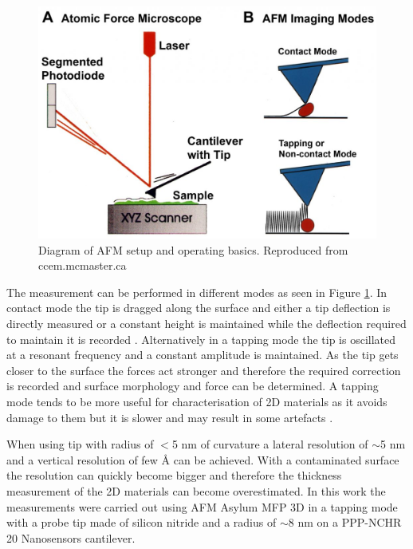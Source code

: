 \begin{figure}[!h]
	\begin{center}
		\includegraphics[scale=0.3]{Methodology/AFMSetup.png}
		\caption{Diagram of AFM setup and operating basics. Reproduced from ccem.mcmaster.ca}
		\label{fig:MethodologyAFMSetup}
	\end{center}
\end{figure}

The measurement can be performed in different modes as seen in Figure \ref{fig:MethodologyAFMSetup}. In contact mode the tip is dragged along the surface and either a tip deflection is directly measured or a constant height is maintained while the deflection required to maintain it is recorded \cite{Binnig1993}. Alternatively in a tapping mode the tip is oscillated at a resonant frequency and a constant amplitude is maintained. As the tip gets closer to the surface the forces act stronger and therefore the required correction is recorded and surface morphology and force can be determined. A tapping mode tends to be more useful for characterisation of 2D materials as it avoids damage to them but it is slower and may result in some artefacts \cite{Schmitz1997}.

When using tip with radius of $<$5 nm of curvature a lateral resolution of $\sim$5 nm and a vertical resolution of few \r{A} can be achieved. With a contaminated surface the resolution can quickly become bigger and therefore the thickness measurement of the 2D materials can become overestimated. In this work the measurements were carried out using AFM Asylum MFP 3D in a tapping mode with a probe tip made of silicon nitride and a radius of $\sim$8 nm on a PPP-NCHR 20 Nanosensors cantilever.

